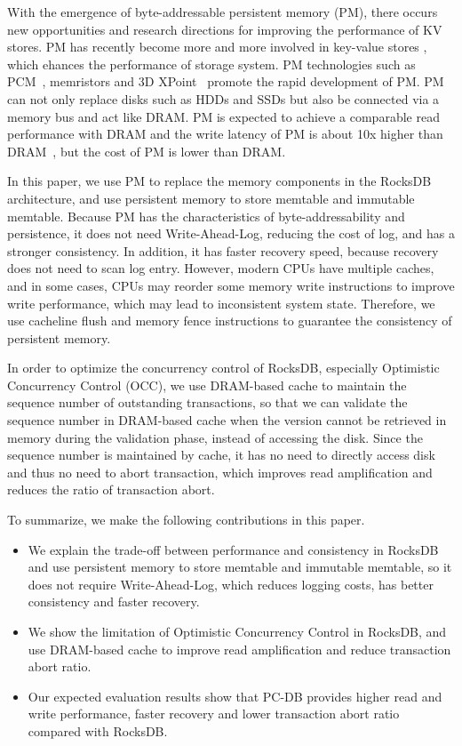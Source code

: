 With the emergence of byte-addressable persistent memory (PM), there occurs new opportunities and research directions for improving the performance of KV stores. PM has recently become more and more involved in key-value stores \cite{NVMRocks,DBLP:conf/usenix/KannanBGAA18,DBLP:conf/usenix/XiaJXS17}, which ehances the performance of storage system. PM technologies such as PCM~\cite{PCM}, memristors and 3D XPoint~\cite{3DXPoint} promote the rapid development of PM. PM can not only replace disks such as HDDs and SSDs but also be connected via a memory bus and act like DRAM. PM is expected to achieve a comparable read performance with DRAM and the write latency of PM is about 10x higher than DRAM~\cite{DBLP:conf/usenix/XiaJXS17}, but the cost of PM is lower than DRAM. 

In this paper, we use PM to replace the memory components in the RocksDB architecture, and use persistent memory to store memtable and immutable memtable. Because PM has the characteristics of byte-addressability and persistence, it does not need Write-Ahead-Log, reducing the cost of log, and has a stronger consistency. In addition, it has faster recovery speed, because recovery does not need to scan log entry. However, modern CPUs have multiple caches, and in some cases, CPUs may reorder some memory write instructions to improve write performance, which may lead to inconsistent system state. Therefore, we use cacheline flush and memory fence instructions to guarantee the consistency of persistent memory.

In order to optimize the concurrency control of RocksDB, especially Optimistic Concurrency Control (OCC), we use DRAM-based cache to maintain the sequence number of outstanding transactions, so that we can validate the sequence number in DRAM-based cache when the version cannot be retrieved in memory during the validation phase, instead of accessing the disk. Since the sequence number is maintained by cache, it has no need to directly access disk and thus no need to abort transaction, which improves read amplification and reduces the ratio of transaction abort.

To summarize, we make the following contributions in this paper.
\begin{itemize}
\item We explain the trade-off between performance and consistency in RocksDB and use persistent memory to store memtable and immutable memtable, so it does not require Write-Ahead-Log, which reduces logging costs, has better consistency and faster recovery.
\item We show the limitation of Optimistic Concurrency Control in RocksDB, and use DRAM-based cache to improve read amplification and reduce transaction abort ratio.
\item Our expected evaluation results show that PC-DB provides higher read and write performance, faster recovery and lower transaction abort ratio compared with RocksDB.
\end{itemize}

